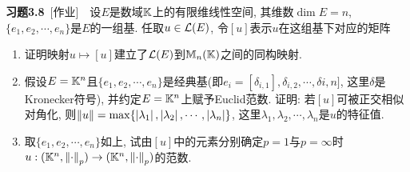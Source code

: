 	\textbf{习题3.8}\ [作业]\ \ 设$ E $是数域$ \mathbb{K} $上的有限维线性空间, 其维数$ \dim E=n $, $ \{ e_1,e_2,\cdots,e_n \} $是$ E $的一组基. 任取$ u\in\mathcal{L}(E) $, 令$ [u] $表示$ u $在这组基下对应的矩阵
	\begin{enumerate}[(1)]
	\item 证明映射$ u\mapsto[u] $建立了$ \mathcal{L}(E) $到$ \mathbb{M}_n(\mathbb{K}) $之间的同构映射.
	\item 假设$ E=\mathbb{K}^n $且$ \{ e_1,e_2,\cdots,e_n \} $是经典基(即$ e_i=[\delta_{i,1}],\delta_{i,2},\cdots,\delta{i,n}] $, 这里$ \delta $是Kronecker符号), 并约定$ E=\mathbb{K}^n $上赋予Euclid范数. 证明: 若$ [u] $可被正交相似对角化, 则$ \left\| u \right\|=\max\{ \left| \lambda_1 \right| ,\left| \lambda_2 \right| ,\cdots,\left| \lambda_n \right|  \} $, 这里$ \lambda_1,\lambda_2,\cdots,\lambda_n $是$ u $的特征值.
	\item 取$ \{ e_1,e_2,\cdots,e_n \} $如上, 试由$ [u] $中的元素分别确定$ p=1 $与$ p=\infty $时$ u : (\mathbb{K}^n,\left\| \cdot \right\|_p)\to(\mathbb{K}^n,\left\| \cdot \right\|_p) $的范数.
	\end{enumerate}
